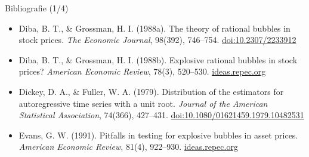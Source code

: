 \begin{frame}{Bibliografie (1/4)}
\begin{itemize}
    \item Diba, B. T., \& Grossman, H. I. (1988a). The theory of rational bubbles in stock prices. \textit{The Economic Journal}, 98(392), 746--754. \href{https://doi.org/10.2307/2233912}{doi:10.2307/2233912}
    \item Diba, B. T., \& Grossman, H. I. (1988b). Explosive rational bubbles in stock prices? \textit{American Economic Review}, 78(3), 520--530. \href{https://ideas.repec.org/a/aea/aecrev/v78y1988i3p520-30.html}{ideas.repec.org}
    \item Dickey, D. A., \& Fuller, W. A. (1979). Distribution of the estimators for autoregressive time series with a unit root. \textit{Journal of the American Statistical Association}, 74(366), 427--431. \href{https://doi.org/10.1080/01621459.1979.10482531}{doi:10.1080/01621459.1979.10482531}
    \item Evans, G. W. (1991). Pitfalls in testing for explosive bubbles in asset prices. \textit{American Economic Review}, 81(4), 922--930. \href{https://ideas.repec.org/a/aea/aecrev/v81y1991i4p922-30.html}{ideas.repec.org}
\end{itemize}
\end{frame}

